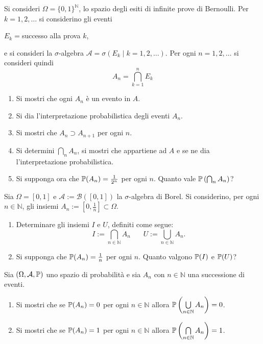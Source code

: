 Si consideri $\Omega =\{0,1\}^{\mathbb{N}}$, lo spazio degli esiti di infinite prove di Bernoulli. Per $k=1,2,\dotsc $ si considerino gli eventi
\begin{center}
$E_{k} =$successo alla prova $k$,
\end{center}
e si consideri la $\sigma $-algebra $\mathcal{A} =\sigma ( E_{k} \mid k=1,2,\dotsc )$. Per ogni $n=1,2,\dotsc $ si consideri quindi
\begin{equation*}
A_{n} =\bigcap _{k=1}^{n} E_{k}
\end{equation*}
\begin{enumerate}
\item Si mostri che ogni $A_{n}$ è un evento in $A$.
\item Si dia l'interpretazione probabilistica degli eventi $A_{n}$.
\item Si mostri che $A_{n} \supset A_{n+1}$ per ogni $n$.
\item Si determini $\bigcap _{n} A_{n}$, si mostri che appartiene ad $A$ e se ne dia l'interpretazione probabilistica.
\item Si supponga ora che $\P( A_{n}) =\frac{1}{2^{n}}$ per ogni $n$. Quanto vale $\P\left(\bigcap\nolimits _{n} A_{n}\right)$?
\end{enumerate}
\Esercizio{}

Sia $\Omega =[ 0,1]$ e $\mathcal{A} :=\mathcal{B}([ 0,1])$ la $\sigma $-algebra di Borel. Si considerino, per ogni $n\in \mathbb{N}$, gli insiemi $A_{n} :=\left[ 0,\frac{1}{n}\right] \subset \Omega $.
\begin{enumerate}
\item Determinare gli insiemi $I$ e $U$, definiti come segue:\begin{equation*}
I:=\bigcap _{n\in \mathbb{N}} A_{n} \ \ \ \ \ \ \ \ U:=\bigcup _{n\in \mathbb{N}} A_{n} .
\end{equation*}
\item Si supponga che $\P( A_{n}) =\frac{1}{n}$ per ogni $n$. Quanto valgono $\P( I)$ e $\P( U)$?
\end{enumerate}
\Esercizio{$(\star)$}

Sia $( \Omega ,\mathcal{A} ,\P)$ uno spazio di probabilità e sia $A_{n}$ con $n\in \mathbb{N}$ una successione di eventi.
\begin{enumerate}
\item Si mostri che se $\P( A_{n}) =0$ per ogni $n\in \mathbb{N}$ allora $\P\left(\bigcup\limits _{n\in \mathbb{N}} A_{n}\right) =0$.
\item Si mostri che se $\P( A_{n}) =1$ per ogni $n\in \mathbb{N}$ allora $\P\left(\bigcap\limits _{n\in \mathbb{N}} A_{n}\right) =1$.
\end{enumerate}
\Esercizio{$(\star)$}

